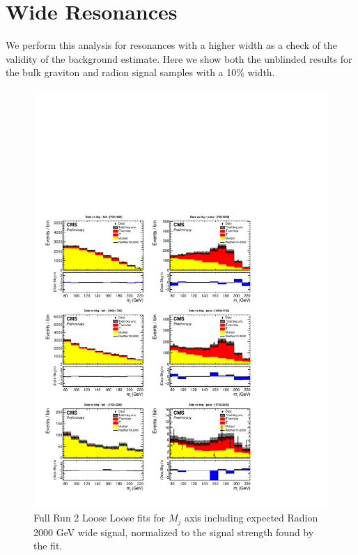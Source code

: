 \section{Wide Resonances}
We perform this analysis for resonances with a higher width as a check of the validity of the background estimate. Here we show both the unblinded results for the bulk graviton and radion signal samples with a 10\% width. 
\begin{figure}[!htb]
	\centering
	\includegraphics[width=1\textwidth]{Figures/postfit_projx_fits_LLwide.pdf}
	\caption{Full Run 2 Loose Loose fits for $M_j$ axis including expected Radion 2000 GeV wide signal, normalized to the signal strength found by the fit.}
	\label{fig:LLmjwide}
\end{figure}
